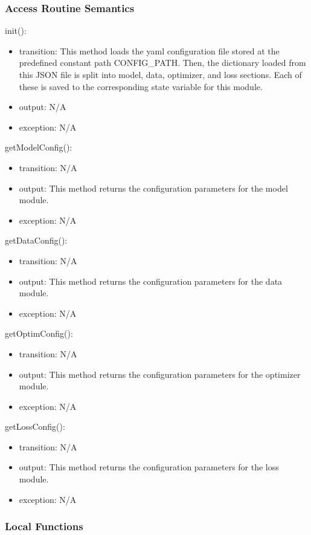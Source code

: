 \documentclass[12pt, titlepage]{article}
\begin{document}
\subsubsection{Access Routine Semantics}
\noindent init():
\begin{itemize}
  \item transition: This method loads the yaml configuration file stored at the predefined constant path CONFIG\_PATH. Then, the dictionary loaded from this JSON file is split into model, data, optimizer, and loss sections. Each of these is saved to the corresponding state variable for this module.
  \item output: N/A
  \item exception: N/A
\end{itemize}

\noindent getModelConfig():
\begin{itemize}
\item transition: N/A 
\item output: This method returns the configuration parameters for the model module.
\item exception: N/A
\end{itemize}

\noindent getDataConfig():
\begin{itemize}
  \item transition: N/A
  \item output: This method returns the configuration parameters for the data module.
  \item exception: N/A
\end{itemize}

\noindent getOptimConfig():
\begin{itemize}
  \item transition: N/A
  \item output: This method returns the configuration parameters for the optimizer module.
  \item exception: N/A
\end{itemize}

\noindent getLossConfig():
\begin{itemize}
  \item transition: N/A
  \item output: This method returns the configuration parameters for the loss module.
  \item exception: N/A
\end{itemize}

\subsubsection{Local Functions}
\end{document}
